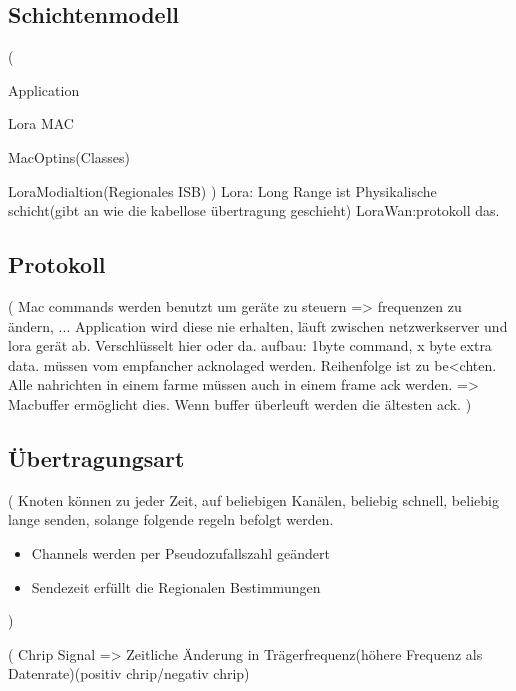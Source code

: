 \documentclass[a4paper,12pt]{article}
\begin{document}
        \subsection{Schichtenmodell}

            \cite{WhatIsLoRa}(

            Application

            Lora MAC

            MacOptins(Classes)

            LoraModialtion(Regionales ISB)
            )
            Lora: Long Range ist Physikalische schicht(gibt an wie die kabellose übertragung geschieht)
            LoraWan:protokoll das.
        \subsection{Protokoll}
            \cite{LoRaSpec}(
                Mac commands werden benutzt um geräte zu steuern => frequenzen zu ändern, ...
                Application wird diese nie erhalten, läuft zwischen netzwerkserver und lora gerät ab.
                Verschlüsselt hier oder da.
                aufbau: 1byte command, x byte extra data.
                müssen vom empfancher acknolaged werden. Reihenfolge ist zu be<chten. Alle nahrichten in einem farme müssen auch in einem frame ack werden. => Macbuffer ermöglicht dies. Wenn buffer überleuft werden die ältesten ack. 
            )
        \subsection{Übertragungsart}
            \cite{LoRaSpec}(
                Knoten können zu jeder Zeit, auf beliebigen Kanälen, beliebig schnell, beliebig lange senden, solange folgende regeln befolgt werden.
                \begin{itemize}
                    
                        \item Channels werden per Pseudozufallszahl geändert
                        \item Sendezeit erfüllt die Regionalen Bestimmungen
                    
                \end{itemize}
            )

            \cite{LoraLimit}(
                Chrip Signal => Zeitliche Änderung in Trägerfrequenz(höhere Frequenz als Datenrate)(positiv chrip/negativ chrip)
\end{document}
